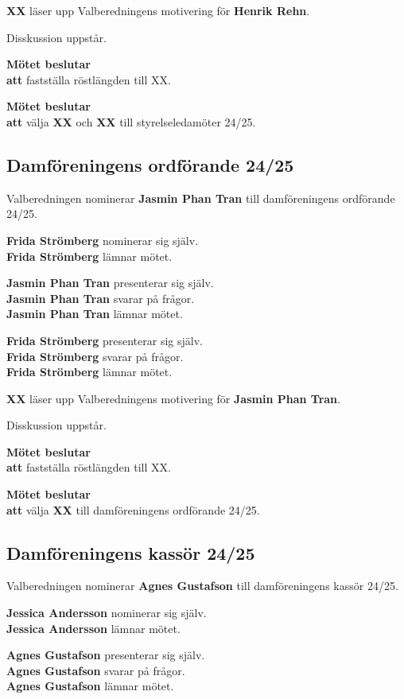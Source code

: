 \documentclass{datateknologsektionen-document}
\newcommand{\ind}{\hspace*{2em}}
\newcommand{\motetbeslutar}{\textbf{Mötet beslutar}}
\newcommand{\att}{\\\ind\textbf{att}}
\begin{document}
\textbf{XX} läser upp Valberedningens motivering för \textbf{Henrik Rehn}.

Disskussion uppstår.

\motetbeslutar
\att{} fastställa röstlängden till XX.

\motetbeslutar
\att{} välja \textbf{XX} och \textbf{XX} till styrelseledamöter 24/25.

\subsection{Damföreningens ordförande 24/25}

Valberedningen nominerar \textbf{Jasmin Phan Tran} till damföreningens ordförande 24/25.

\textbf{Frida Strömberg} nominerar sig själv. \\
\textbf{Frida Strömberg} lämnar mötet.

\textbf{Jasmin Phan Tran} presenterar sig själv.\\
\textbf{Jasmin Phan Tran} svarar på frågor.\\
\textbf{Jasmin Phan Tran} lämnar mötet.

\textbf{Frida Strömberg} presenterar sig själv.\\
\textbf{Frida Strömberg} svarar på frågor.\\
\textbf{Frida Strömberg} lämnar mötet.

\textbf{XX} läser upp Valberedningens motivering för \textbf{Jasmin Phan Tran}.

Disskussion uppstår.

\motetbeslutar
\att{} fastställa röstlängden till XX.

\motetbeslutar
\att{} välja \textbf{XX} till damföreningens ordförande 24/25.

\subsection{Damföreningens kassör 24/25}

Valberedningen nominerar \textbf{Agnes Gustafson} till damföreningens kassör 24/25.

\textbf{Jessica Andersson} nominerar sig själv. \\
\textbf{Jessica Andersson} lämnar mötet.

\textbf{Agnes Gustafson} presenterar sig själv.\\
\textbf{Agnes Gustafson} svarar på frågor.\\
\textbf{Agnes Gustafson} lämnar mötet.
\end{document}
